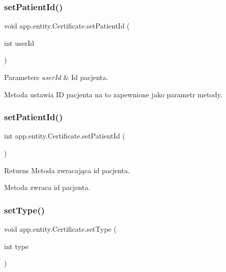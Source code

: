 \subsubsection{\texorpdfstring{setPatientId()}{setPatientId()}\hspace{0.1cm}{\footnotesize\ttfamily [1/2]}}
{\footnotesize\ttfamily void app.\+entity.\+Certificate.\+set\+Patient\+Id (\begin{DoxyParamCaption}\item[{int}]{user\+Id }\end{DoxyParamCaption})}


\begin{DoxyParams}{Parameters}
{\em user\+Id} & Id pacjenta.\\
\hline
\end{DoxyParams}
Metoda ustawia ID pacjenta na to zapewnione jako parametr metody. \mbox{\label{classapp_1_1entity_1_1_certificate_a89211cfa9672944116ef046c07d9d0ad}} 
\subsubsection{\texorpdfstring{setPatientId()}{setPatientId()}\hspace{0.1cm}{\footnotesize\ttfamily [2/2]}}
{\footnotesize\ttfamily int app.\+entity.\+Certificate.\+set\+Patient\+Id (\begin{DoxyParamCaption}{ }\end{DoxyParamCaption})}

\begin{DoxyReturn}{Returns}
Metoda zwracająca id pacjenta.
\end{DoxyReturn}
Metoda zwraca id pacjenta. \mbox{\label{classapp_1_1entity_1_1_certificate_a1b99e541f40ffaac1d3e7ce345074af9}} 
\subsubsection{\texorpdfstring{setType()}{setType()}}
{\footnotesize\ttfamily void app.\+entity.\+Certificate.\+set\+Type (\begin{DoxyParamCaption}\item[{int}]{type }\end{DoxyParamCaption})}


